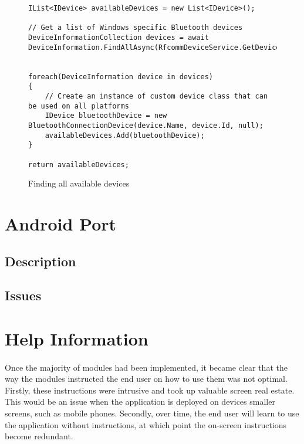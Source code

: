 		\begin{figure}[h]
			\begin{lstlisting}
IList<IDevice> availableDevices = new List<IDevice>();

// Get a list of Windows specific Bluetooth devices
DeviceInformationCollection devices = await DeviceInformation.FindAllAsync(RfcommDeviceService.GetDeviceSelector(RfcommServiceId.SerialPort));


foreach(DeviceInformation device in devices)
{
	// Create an instance of custom device class that can be used on all platforms
	IDevice bluetoothDevice = new BluetoothConnectionDevice(device.Name, device.Id, null);
    availableDevices.Add(bluetoothDevice);
}

return availableDevices;
			\end{lstlisting}
			\caption{Finding all available devices}
			\label{code:AvailableDevices}
		\end{figure}				
		
\section{Android Port}
	\subsection{Description}		
		\paragraph{}{
		}	
	\subsection{Issues}{
	}
	\label{ssec:AndroidIssues}
\section{Help Information}
		\paragraph{}{
		Once the majority of modules had been implemented, it became clear that the way the modules instructed the end user on how to use them was not optimal. Firstly, these instructions were intrusive and took up valuable screen real estate. This would be an issue when the application is deployed on devices smaller screens, such as mobile phones. Secondly, over time, the end user will learn to use the application without instructions, at which point the on-screen instructions become redundant.
		}
